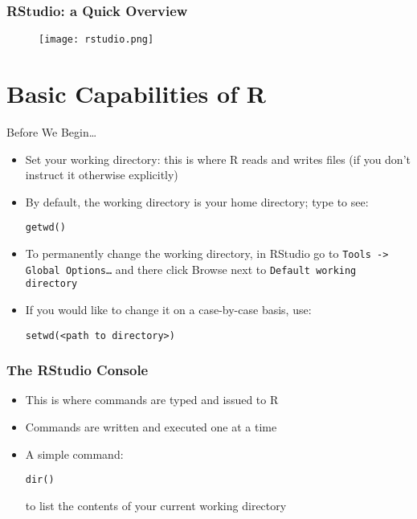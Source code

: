 \documentclass[10pt]{beamer}
\theoremstyle{definition}
\begin{document}
\begin{frame}[fragile]
\frametitle{RStudio: a Quick Overview}
\begin{figure}
	\centering
	\texttt{[image: rstudio.png]}
\end{figure}
\end{frame}

\section{Basic Capabilities of R}

\begin{frame}[fragile]{Before We Begin\ldots}
\begin{itemize}
	\item Set your working directory: this is where R reads and writes files (if you don't instruct it otherwise explicitly)
	
	\item By default, the working directory is your home directory; type to see:
	\begin{lstlisting}[style = rstyle, breaklines]
	getwd()
	\end{lstlisting}

	\item To permanently change the working directory, in RStudio go to \texttt{Tools -> Global Options\ldots} and there click Browse next to \texttt{Default working directory}
	
	\item If you would like to change it on a case-by-case basis, use:
	\begin{lstlisting}[style = rstyle, breaklines]
	setwd(<path to directory>)
	\end{lstlisting}
\end{itemize}
\end{frame}

\begin{frame}[fragile]
\frametitle{The RStudio Console}
\begin{itemize}
	\item This is where commands are typed and issued to R

	\item Commands are written and executed one at a time
	
	\item A simple command:
	\begin{lstlisting}[style = rstyle, breaklines]
	dir()
	\end{lstlisting}
	
	to list the contents of your current working directory
\end{itemize}
\end{frame}
\end{document}
